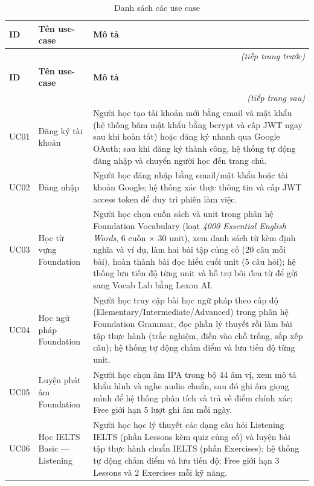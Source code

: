 \renewcommand{\arraystretch}{1.3}
\setlength{\tbu}{\dimexpr(\linewidth - 6\tabcolsep - 4\arrayrulewidth)/150\relax}
\begin{longtable}{|p{15\tbu}|p{45\tbu}|p{90\tbu}|}
    \caption{Danh sách các use case} \label{tab:uc_list} \\
    \hline
    \textbf{ID} & \textbf{Tên use-case} & \textbf{Mô tả} \\ \hline
    \endfirsthead
    \multicolumn{3}{r}{\textit{(tiếp trang trước)}} \\
    \hline
    \textbf{ID} & \textbf{Tên use-case} & \textbf{Mô tả} \\ \hline
    \endhead
    \hline \multicolumn{3}{r}{\textit{(tiếp trang sau)}} \\
    \endfoot
    \endlastfoot
    UC01 & Đăng ký tài khoản & Người học tạo tài khoản mới bằng email và mật khẩu (hệ thống băm mật khẩu bằng bcrypt và cấp JWT ngay sau khi hoàn tất) hoặc đăng ký nhanh qua Google OAuth; sau khi đăng ký thành công, hệ thống tự động đăng nhập và chuyển người học đến trang chủ. \\ \hline
    UC02 & Đăng nhập & Người học đăng nhập bằng email/mật khẩu hoặc tài khoản Google; hệ thống xác thực thông tin và cấp JWT access token để duy trì phiên làm việc. \\ \hline
    UC03 & Học từ vựng Foundation & Người học chọn cuốn sách và unit trong phân hệ Foundation Vocabulary (loạt \textit{4000 Essential English Words}, 6 cuốn $\times$ 30 unit), xem danh sách từ kèm định nghĩa và ví dụ, làm hai bài tập củng cố (20 câu mỗi bài), hoàn thành bài đọc hiểu cuối unit (5 câu hỏi); hệ thống lưu tiến độ từng unit và hỗ trợ bôi đen từ để gửi sang Vocab Lab bằng Lexon AI. \\ \hline
    UC04 & Học ngữ pháp Foundation & Người học truy cập bài học ngữ pháp theo cấp độ (Elementary/Intermediate/Advanced) trong phân hệ Foundation Grammar, đọc phần lý thuyết rồi làm bài tập thực hành (trắc nghiệm, điền vào chỗ trống, sắp xếp câu); hệ thống tự động chấm điểm và lưu tiến độ từng unit. \\ \hline
    UC05 & Luyện phát âm Foundation & Người học chọn âm IPA trong bộ 44 âm vị, xem mô tả khẩu hình và nghe audio chuẩn, sau đó ghi âm giọng mình để hệ thống phân tích và trả về điểm chính xác; Free giới hạn 5 lượt ghi âm mỗi ngày. \\ \hline
    UC06 & Học IELTS Basic --- Listening & Người học học lý thuyết các dạng câu hỏi Listening IELTS (phần Lessons kèm quiz củng cố) và luyện bài tập thực hành chuẩn IELTS (phần Exercises); hệ thống tự động chấm điểm và lưu tiến độ; Free giới hạn 3 Lessons và 2 Exercises mỗi kỹ năng. \\ \hline

\end{longtable}

